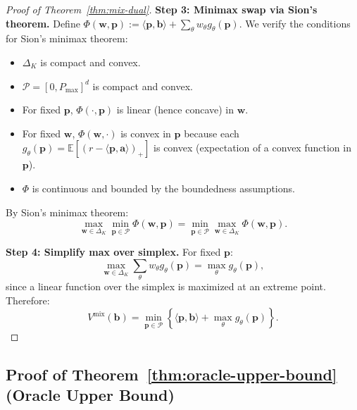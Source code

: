 \documentclass[11pt]{article}
\newcommand{\bb}{\mathbf{b}}
\newcommand{\ba}{\mathbf{a}}
\newcommand{\bp}{\mathbf{p}}
\newcommand{\bw}{\mathbf{w}}
\newcommand{\E}{\mathbb{E}}
\newcommand{\cP}{\mathcal{P}}
\begin{document}
\begin{proof}[Proof of Theorem~\ref{thm:mix-dual}]
\textbf{Step 3: Minimax swap via Sion's theorem.}
Define $\Phi(\bw, \bp) := \langle \bp, \bb \rangle + \sum_\theta w_\theta g_\theta(\bp)$. We verify the conditions for Sion's minimax theorem:
\begin{itemize}
    \item $\Delta_K$ is compact and convex.
    \item $\cP = [0, P_{\max}]^d$ is compact and convex.
    \item For fixed $\bp$, $\Phi(\cdot, \bp)$ is linear (hence concave) in $\bw$.
    \item For fixed $\bw$, $\Phi(\bw, \cdot)$ is convex in $\bp$ because each $g_\theta(\bp) = \E[(r - \langle \bp, \ba \rangle)_+]$ is convex (expectation of a convex function in $\bp$).
    \item $\Phi$ is continuous and bounded by the boundedness assumptions.
\end{itemize}
By Sion's minimax theorem:
\[
\max_{\bw \in \Delta_K} \min_{\bp \in \cP} \Phi(\bw, \bp) = \min_{\bp \in \cP} \max_{\bw \in \Delta_K} \Phi(\bw, \bp).
\]

\textbf{Step 4: Simplify max over simplex.}
For fixed $\bp$:
\[
\max_{\bw \in \Delta_K} \sum_\theta w_\theta g_\theta(\bp) = \max_\theta g_\theta(\bp),
\]
since a linear function over the simplex is maximized at an extreme point. Therefore:
\[
V^{\mathrm{mix}}(\bb) = \min_{\bp \in \cP} \left\{ \langle \bp, \bb \rangle + \max_\theta g_\theta(\bp) \right\}.
\]
\end{proof}

\subsection{Proof of Theorem~\ref{thm:oracle-upper-bound} (Oracle Upper Bound)}
\end{document}
